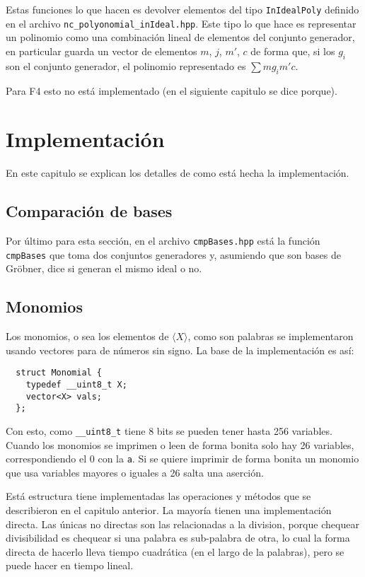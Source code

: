 \documentclass{report}
\theoremstyle{customstyle}
\theoremstyle{factstyle}
\begin{document}
Estas funciones lo que hacen es devolver elementos del tipo \texttt{InIdealPoly} definido en el archivo \texttt{nc\_polyonomial\_inIdeal.hpp}. Este tipo lo que hace es representar un polinomio como una combinación lineal de elementos del conjunto generador, en particular guarda un vector de elementos $m$, $j$, $m'$, $c$ de forma que, si los $g_i$ son el conjunto generador, el polinomio representado es $∑ m g_i m' c$.

Para F4 esto no está implementado (en el siguiente capitulo se dice porque).

\chapter{Implementación}

En este capitulo se explican los detalles de como está hecha la implementación.

\section{Comparación de bases}

Por último para esta sección, en el archivo \texttt{cmpBases.hpp} está la función \texttt{cmpBases} que toma dos conjuntos generadores y, asumiendo que son bases de Gröbner, dice si generan el mismo ideal o no.

\section{Monomios}

Los monomios, o sea los elementos de $⟨X⟩$, como son palabras se implementaron usando vectores para de números sin signo. La base de la implementación es así:

\begin{verbatim}
  struct Monomial {
    typedef __uint8_t X;
    vector<X> vals;
  };
\end{verbatim}

Con esto, como \texttt{\_\_uint8\_t} tiene 8 bits se pueden tener hasta 256 variables. Cuando los monomios se imprimen o leen de forma bonita solo hay 26 variables, correspondiendo el 0 con la \texttt{a}. Si se quiere imprimir de forma bonita un monomio que usa variables mayores o iguales a 26 salta una aserción.

Está estructura tiene implementadas las operaciones y métodos que se describieron en el capitulo anterior. La mayoría tienen una implementación directa. Las únicas no directas son las relacionadas a la division, porque chequear divisibilidad es chequear si una palabra es sub-palabra de otra, lo cual la forma directa de hacerlo lleva tiempo cuadrática (en el largo de la palabras), pero se puede hacer en tiempo lineal.
\end{document}
